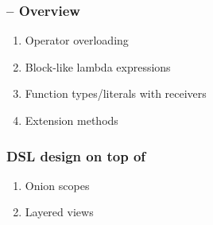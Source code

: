 \documentclass[presentation]{beamer}
\begin{document}
\begin{frame}%
    \frametitle{\twopkt{} -- Overview}

    \begin{enumerate}
        \item Operator overloading

        \item Block-like lambda expressions

        \item Function types/literals with receivers

        \item Extension methods
    \end{enumerate}

\end{frame}

\begin{frame}%
    \frametitle{DSL design on top of \twopkt}

    \begin{enumerate}
        \item Onion scopes

        \item Layered views
    \end{enumerate}

\end{frame}
\end{document}
